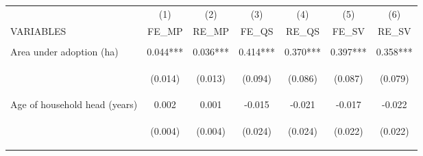 \begin{center}
\begin{tabular}{lcccccc} \hline
 & (1) & (2) & (3) & (4) & (5) & (6) \\
VARIABLES & FE\_MP & RE\_MP & FE\_QS & RE\_QS & FE\_SV & RE\_SV \\ \hline
\vspace{4pt} & \begin{footnotesize}\end{footnotesize} & \begin{footnotesize}\end{footnotesize} & \begin{footnotesize}\end{footnotesize} & \begin{footnotesize}\end{footnotesize} & \begin{footnotesize}\end{footnotesize} & \begin{footnotesize}\end{footnotesize} \\
Area under adoption (ha) & 0.044*** & 0.036*** & 0.414*** & 0.370*** & 0.397*** & 0.358*** \\
\vspace{4pt} & \begin{footnotesize}(0.014)\end{footnotesize} & \begin{footnotesize}(0.013)\end{footnotesize} & \begin{footnotesize}(0.094)\end{footnotesize} & \begin{footnotesize}(0.086)\end{footnotesize} & \begin{footnotesize}(0.087)\end{footnotesize} & \begin{footnotesize}(0.079)\end{footnotesize} \\
Age of household head (years) & 0.002 & 0.001 & -0.015 & -0.021 & -0.017 & -0.022 \\
\vspace{4pt} & \begin{footnotesize}(0.004)\end{footnotesize} & \begin{footnotesize}(0.004)\end{footnotesize} & \begin{footnotesize}(0.024)\end{footnotesize} & \begin{footnotesize}(0.024)\end{footnotesize} & \begin{footnotesize}(0.022)\end{footnotesize} & \begin{footnotesize}(0.022)\end{footnotesize} \\

\end{tabular}
\end{center}
